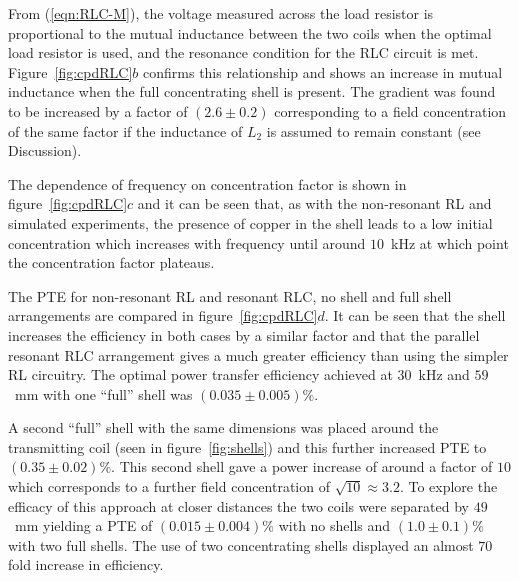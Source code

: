 \documentclass[11pt]{iopart}
\begin{document}
From (\ref{eqn:RLC-M}), the voltage measured across the load
resistor is proportional to the mutual inductance between the two
coils when the optimal load resistor is used, and the resonance
condition for the RLC circuit is met. Figure~\ref{fig:cpdRLC}$b$
confirms this relationship and shows an increase in mutual inductance
when the full concentrating shell is present. The gradient was found
to be increased by a factor of $(2.6 \pm 0.2)$ corresponding to a field
concentration of the same factor if the inductance of $L_2$ is assumed
to remain constant (see Discussion). 

The dependence of frequency on concentration factor is shown in
figure~\ref{fig:cpdRLC}$c$ and it can be seen that, as with the non-resonant RL and
simulated experiments, the presence of copper in the shell leads to a
low initial concentration which increases with frequency until around
$10$~kHz at which point the concentration factor plateaus.

The PTE for non-resonant RL and resonant RLC, no shell and full shell arrangements are
compared in figure~\ref{fig:cpdRLC}$d$. It can be seen that the shell
increases the efficiency in both cases by a similar factor and that
the parallel resonant RLC arrangement gives a much greater efficiency
than using the simpler RL circuitry. The optimal power transfer
efficiency achieved at $30$~kHz and $59$~mm with one ``full'' shell was
$(0.035\pm0.005)\%$. 

A second ``full'' shell with the same dimensions was placed around the
transmitting coil (seen in figure~\ref{fig:shells}) and this further
increased PTE to $(0.35\pm0.02)\%$. This second shell gave a power
increase of around a factor of $10$ which corresponds to a further
field concentration of $\sqrt{10} \approx 3.2$. To explore the
efficacy of this approach at closer distances the two coils were
separated by $49$~mm yielding a PTE of $(0.015\pm0.004)\%$ with no
shells and $(1.0\pm0.1)\%$ with two full shells. The use of two
concentrating shells displayed an almost $70$ fold increase in
efficiency.
\end{document}
